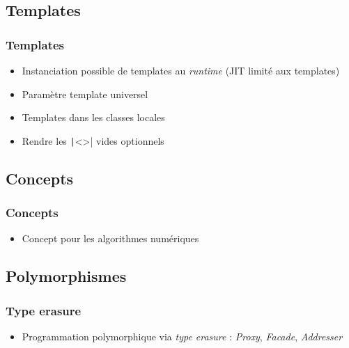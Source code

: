 \documentclass[C++.tex]{subfiles}
\begin{document}
\subsection*{Templates}
\begin{frame}[fragile]
	\frametitle{Templates}
	\begin{itemize}
		\item Instanciation possible de templates au \textit{runtime} (JIT limité aux templates)


		\item Paramètre template universel


		\item Templates dans les classes locales
		\item Rendre les \texttt|<>| vides optionnels
	\end{itemize}
\end{frame}

\subsection*{Concepts}
\begin{frame}[fragile]
	\frametitle{Concepts}
	\begin{itemize}
		\item Concept pour les algorithmes numériques
	\end{itemize}
\end{frame}

\subsection*{Polymorphismes}
\begin{frame}[fragile]
	\frametitle{Type erasure}
	\begin{itemize}
		\item Programmation polymorphique via \textit{type erasure} : \textit{Proxy}, \textit{Facade}, \textit{Addresser}

	\end{itemize}
\end{frame}
\end{document}
